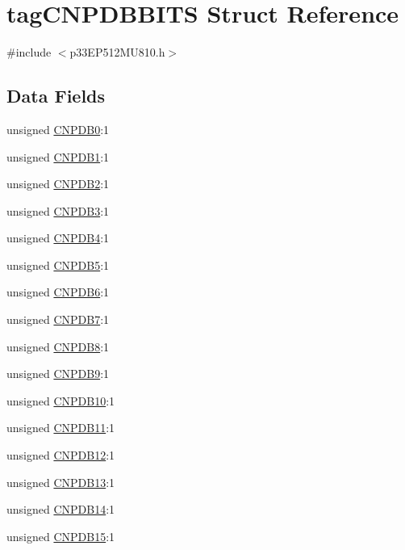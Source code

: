 \hypertarget{structtag_c_n_p_d_b_b_i_t_s}{}\section{tag\+C\+N\+P\+D\+B\+B\+I\+TS Struct Reference}
\label{structtag_c_n_p_d_b_b_i_t_s}


{\ttfamily \#include $<$p33\+E\+P512\+M\+U810.\+h$>$}

\subsection*{Data Fields}
\begin{DoxyCompactItemize}
\item 
unsigned \hyperlink{structtag_c_n_p_d_b_b_i_t_s_a3c8673dcb191762ef1a27ae2243c9485}{C\+N\+P\+D\+B0}\+:1
\item 
unsigned \hyperlink{structtag_c_n_p_d_b_b_i_t_s_a770a950b3485ac601e85e8af219d2f22}{C\+N\+P\+D\+B1}\+:1
\item 
unsigned \hyperlink{structtag_c_n_p_d_b_b_i_t_s_afdce92419f91db3697d561a485b88612}{C\+N\+P\+D\+B2}\+:1
\item 
unsigned \hyperlink{structtag_c_n_p_d_b_b_i_t_s_af055ac81526be0e9550a85e193e2c04f}{C\+N\+P\+D\+B3}\+:1
\item 
unsigned \hyperlink{structtag_c_n_p_d_b_b_i_t_s_ad37f735bc12596ed4d8e264642b2ed04}{C\+N\+P\+D\+B4}\+:1
\item 
unsigned \hyperlink{structtag_c_n_p_d_b_b_i_t_s_a19facfaa37fb56e28af502d8c9a361ec}{C\+N\+P\+D\+B5}\+:1
\item 
unsigned \hyperlink{structtag_c_n_p_d_b_b_i_t_s_a3cef7d0a021cf305449a621fb3e0e40e}{C\+N\+P\+D\+B6}\+:1
\item 
unsigned \hyperlink{structtag_c_n_p_d_b_b_i_t_s_aa913d386e725326336b97cd4d2b0439a}{C\+N\+P\+D\+B7}\+:1
\item 
unsigned \hyperlink{structtag_c_n_p_d_b_b_i_t_s_a7f7f1546493f6283c1a61ea6dc448f78}{C\+N\+P\+D\+B8}\+:1
\item 
unsigned \hyperlink{structtag_c_n_p_d_b_b_i_t_s_a8a6cf602892fdbefb1da0f66da08119e}{C\+N\+P\+D\+B9}\+:1
\item 
unsigned \hyperlink{structtag_c_n_p_d_b_b_i_t_s_a51535ac5ac5bc945569f2412b61c2a68}{C\+N\+P\+D\+B10}\+:1
\item 
unsigned \hyperlink{structtag_c_n_p_d_b_b_i_t_s_aaa81c8ef40f0ab42f18433036d1296c1}{C\+N\+P\+D\+B11}\+:1
\item 
unsigned \hyperlink{structtag_c_n_p_d_b_b_i_t_s_a6d7ca4df16183f515d1cb31ad149d001}{C\+N\+P\+D\+B12}\+:1
\item 
unsigned \hyperlink{structtag_c_n_p_d_b_b_i_t_s_ada9a42c97170f0ca1eadc4c55fab893d}{C\+N\+P\+D\+B13}\+:1
\item 
unsigned \hyperlink{structtag_c_n_p_d_b_b_i_t_s_a0654d2eee7a8b88f7f3d07da7cee1122}{C\+N\+P\+D\+B14}\+:1
\item 
unsigned \hyperlink{structtag_c_n_p_d_b_b_i_t_s_abc7e09fd2a0d9458613972b5b23588f3}{C\+N\+P\+D\+B15}\+:1
\end{DoxyCompactItemize}


